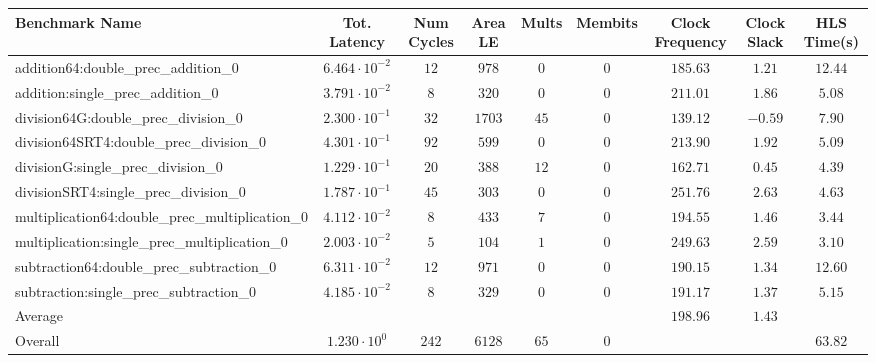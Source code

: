 \begin{tabular}{|l|c|c|c|c|c|c|c|c|}
\hline
Benchmark Name                                   & Tot. Latency            & Num Cycles & Area LE  & Mults  & Membits & Clock Frequency & Clock Slack & HLS Time(s) \\
\hline
addition64:double\_prec\_addition\_0             & $ 6.464 \cdot 10^{-2} $ & $ 12     $ & $ 978  $ & $ 0  $ & $ 0   $ & $ 185.63      $ & $ 1.21    $ & $ 12.44   $ \\
addition:single\_prec\_addition\_0               & $ 3.791 \cdot 10^{-2} $ & $ 8      $ & $ 320  $ & $ 0  $ & $ 0   $ & $ 211.01      $ & $ 1.86    $ & $ 5.08    $ \\
division64G:double\_prec\_division\_0            & $ 2.300 \cdot 10^{-1} $ & $ 32     $ & $ 1703 $ & $ 45 $ & $ 0   $ & $ 139.12      $ & $ -0.59   $ & $ 7.90    $ \\
division64SRT4:double\_prec\_division\_0         & $ 4.301 \cdot 10^{-1} $ & $ 92     $ & $ 599  $ & $ 0  $ & $ 0   $ & $ 213.90      $ & $ 1.92    $ & $ 5.09    $ \\
divisionG:single\_prec\_division\_0              & $ 1.229 \cdot 10^{-1} $ & $ 20     $ & $ 388  $ & $ 12 $ & $ 0   $ & $ 162.71      $ & $ 0.45    $ & $ 4.39    $ \\
divisionSRT4:single\_prec\_division\_0           & $ 1.787 \cdot 10^{-1} $ & $ 45     $ & $ 303  $ & $ 0  $ & $ 0   $ & $ 251.76      $ & $ 2.63    $ & $ 4.63    $ \\
multiplication64:double\_prec\_multiplication\_0 & $ 4.112 \cdot 10^{-2} $ & $ 8      $ & $ 433  $ & $ 7  $ & $ 0   $ & $ 194.55      $ & $ 1.46    $ & $ 3.44    $ \\
multiplication:single\_prec\_multiplication\_0   & $ 2.003 \cdot 10^{-2} $ & $ 5      $ & $ 104  $ & $ 1  $ & $ 0   $ & $ 249.63      $ & $ 2.59    $ & $ 3.10    $ \\
subtraction64:double\_prec\_subtraction\_0       & $ 6.311 \cdot 10^{-2} $ & $ 12     $ & $ 971  $ & $ 0  $ & $ 0   $ & $ 190.15      $ & $ 1.34    $ & $ 12.60   $ \\
subtraction:single\_prec\_subtraction\_0         & $ 4.185 \cdot 10^{-2} $ & $ 8      $ & $ 329  $ & $ 0  $ & $ 0   $ & $ 191.17      $ & $ 1.37    $ & $ 5.15    $ \\
\hline
Average                                          & $                     $ & $        $ & $      $ & $    $ & $     $ & $ 198.96      $ & $ 1.43    $ & $         $ \\
\hline
Overall                                          & $ 1.230 \cdot 10^{0}  $ & $ 242    $ & $ 6128 $ & $ 65 $ & $ 0   $ & $             $ & $         $ & $ 63.82   $ \\
\hline
\end{tabular}
